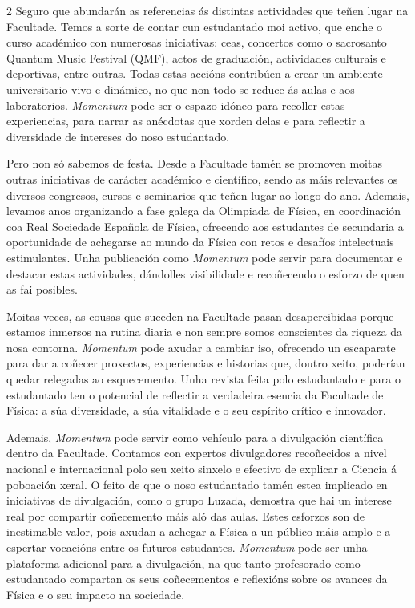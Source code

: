 \begin{multicols}{2}
Seguro que abundarán as referencias ás distintas actividades que teñen lugar na
Facultade. Temos a sorte de contar cun estudantado moi activo, que enche o
curso académico con numerosas iniciativas: ceas, concertos como o sacrosanto
Quantum Music Festival (QMF), actos de graduación, actividades culturais e
deportivas, entre outras. Todas estas accións contribúen a crear un ambiente
universitario vivo e dinámico, no que non todo se reduce ás aulas e aos
laboratorios. \textit{Momentum} pode ser o espazo idóneo para recoller estas
experiencias, para narrar as anécdotas que xorden delas e para reflectir a
diversidade de intereses do noso estudantado.

Pero non só sabemos de festa. Desde a Facultade tamén se promoven moitas outras
iniciativas de carácter académico e científico, sendo as máis relevantes os
diversos congresos, cursos e seminarios que teñen lugar ao longo do ano.
Ademais, levamos anos organizando a fase galega da Olimpiada de Física, en
coordinación coa Real Sociedade Española de Física, ofrecendo aos estudantes de
secundaria a oportunidade de achegarse ao mundo da Física con retos e desafíos
intelectuais estimulantes. Unha publicación como \textit{Momentum} pode servir para
documentar e destacar estas actividades, dándolles visibilidade e recoñecendo o
esforzo de quen as fai posibles.

Moitas veces, as cousas que suceden na Facultade pasan desapercibidas porque
estamos inmersos na rutina diaria e non sempre somos conscientes da riqueza da
nosa contorna. \textit{Momentum} pode axudar a cambiar iso, ofrecendo un escaparate para
dar a coñecer proxectos, experiencias e historias que, doutro xeito, poderían
quedar relegadas ao esquecemento. Unha revista feita polo estudantado e para o
estudantado ten o potencial de reflectir a verdadeira esencia da Facultade de
Física: a súa diversidade, a súa vitalidade e o seu espírito crítico e
innovador.

Ademais, \textit{Momentum} pode servir como vehículo para a divulgación científica
dentro da Facultade. Contamos con expertos divulgadores recoñecidos a nivel
nacional e internacional polo seu xeito sinxelo e efectivo de explicar a
Ciencia á poboación xeral. O feito de que o noso estudantado tamén estea
implicado en iniciativas de divulgación, como o grupo Luzada, demostra que hai
un interese real por compartir coñecemento máis aló das aulas. Estes esforzos
son de inestimable valor, pois axudan a achegar a Física a un público máis
amplo e a espertar vocacións entre os futuros estudantes. \textit{Momentum} pode ser
unha plataforma adicional para a divulgación, na que tanto profesorado como
estudantado compartan os seus coñecementos e reflexións sobre os avances da
Física e o seu impacto na sociedade.


\end{multicols}
